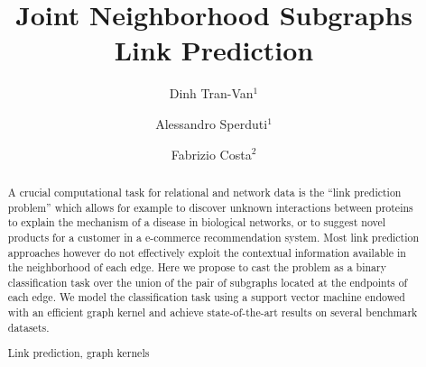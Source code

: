 \documentclass[runningheads,a4paper]{llncs}
\newcommand{\keywords}[1]{\par\addvspace\baselineskip
\noindent\keywordname\enspace\ignorespaces#1}
\begin{document}
\mainmatter  %

\title{Joint Neighborhood Subgraphs Link Prediction}


%
%
\author{Dinh Tran-Van$^1$ \and Alessandro Sperduti$^1$ \and Fabrizio Costa$^2$}
%


%
%

\maketitle


\begin{abstract}
A crucial computational task for relational and network data is the ``link prediction problem'' which allows for example to discover unknown interactions between proteins to explain the mechanism of a disease in biological networks, or to suggest novel products for a customer in a e-commerce recommendation system. Most link prediction approaches however do not effectively exploit the contextual information available in the neighborhood of each edge. Here we propose to cast the problem as a binary classification task over the union of the pair of subgraphs located at the endpoints of each edge. We model the classification task using a support vector machine endowed with an efficient graph kernel and achieve state-of-the-art results on several benchmark datasets. 

\keywords{Link prediction, graph kernels}
\end{abstract}
\end{document}
